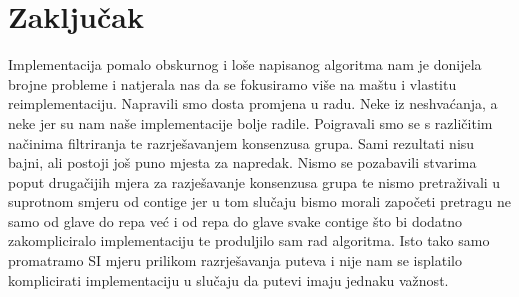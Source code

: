 \chapter{Zaklju\v{c}ak}


Implementacija pomalo obskurnog i loše napisanog algoritma nam je donijela brojne probleme i natjerala nas da se fokusiramo više na maštu i vlastitu reimplementaciju. Napravili smo dosta promjena u radu. Neke iz neshvaćanja, a neke jer su nam naše implementacije bolje radile. Poigravali smo se s različitim načinima filtriranja te razrješavanjem konsenzusa grupa. Sami rezultati nisu bajni, ali postoji još puno mjesta za napredak. Nismo se pozabavili stvarima poput drugačijih mjera za razješavanje konsenzusa grupa te nismo pretraživali u suprotnom smjeru od contige jer u tom slučaju bismo morali započeti pretragu ne samo od glave do repa već i od repa do glave svake contige što bi dodatno zakompliciralo implementaciju te produljilo sam rad algoritma. Isto tako samo promatramo SI mjeru prilikom razrješavanja puteva i nije nam se isplatilo komplicirati implementaciju u slučaju da putevi imaju jednaku važnost.


